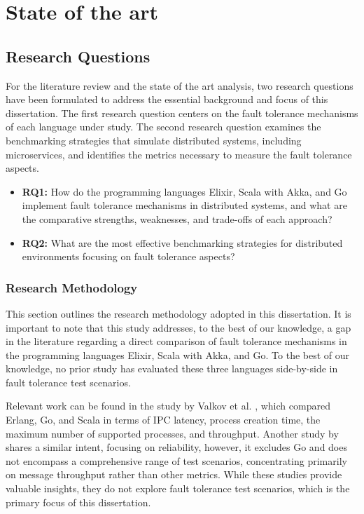 \chapter{State of the art} %

%
\section{Research Questions}

For the literature review and the state of the art analysis, two research questions have been formulated to address the essential background and focus of this dissertation. The first research question centers on the fault tolerance mechanisms of each language under study. The second research question examines the benchmarking strategies that simulate distributed systems, including microservices, and identifies the metrics necessary to measure the fault tolerance aspects.

\begin{itemize}
    \item \textbf{RQ1:} How do the programming languages Elixir, Scala with Akka, and Go implement fault tolerance mechanisms in distributed systems, and what are the comparative strengths, weaknesses, and trade-offs of each approach?
    \item \textbf{RQ2:} What are the most effective benchmarking strategies for distributed environments focusing on fault tolerance aspects?
\end{itemize}

\subsection{Research Methodology}

This section outlines the research methodology adopted in this dissertation. It is important to note that this study addresses, to the best of our knowledge, a gap in the literature regarding a direct comparison of fault tolerance mechanisms in the programming languages Elixir, Scala with Akka, and Go. To the best of our knowledge, no prior study has evaluated these three languages side-by-side in fault tolerance test scenarios.

Relevant work can be found in the study by Valkov et al. \cite{Valkov2018}, which compared Erlang, Go, and Scala in terms of \gls{IPC} latency, process creation time, the maximum number of supported processes, and throughput. Another study by \textcite{Randtoul2022} shares a similar intent, focusing on reliability, however, it excludes Go and does not encompass a comprehensive range of test scenarios, concentrating primarily on message throughput rather than other metrics. While these studies provide valuable insights, they do not explore fault tolerance test scenarios, which is the primary focus of this dissertation.

